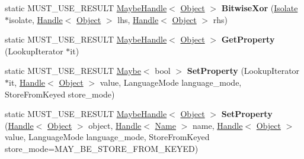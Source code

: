 \begin{DoxyCompactItemize}
\item 
static M\+U\+S\+T\+\_\+\+U\+S\+E\+\_\+\+R\+E\+S\+U\+LT \hyperlink{classv8_1_1internal_1_1_maybe_handle}{Maybe\+Handle}$<$ \hyperlink{classv8_1_1internal_1_1_object}{Object} $>$ {\bfseries Bitwise\+Xor} (\hyperlink{classv8_1_1internal_1_1_isolate}{Isolate} $\ast$isolate, \hyperlink{classv8_1_1internal_1_1_handle}{Handle}$<$ \hyperlink{classv8_1_1internal_1_1_object}{Object} $>$ lhs, \hyperlink{classv8_1_1internal_1_1_handle}{Handle}$<$ \hyperlink{classv8_1_1internal_1_1_object}{Object} $>$ rhs)\hypertarget{classv8_1_1internal_1_1_object_a78654ced315975487c8afea72249be56}{}\label{classv8_1_1internal_1_1_object_a78654ced315975487c8afea72249be56}

\item 
static M\+U\+S\+T\+\_\+\+U\+S\+E\+\_\+\+R\+E\+S\+U\+LT \hyperlink{classv8_1_1internal_1_1_maybe_handle}{Maybe\+Handle}$<$ \hyperlink{classv8_1_1internal_1_1_object}{Object} $>$ {\bfseries Get\+Property} (Lookup\+Iterator $\ast$it)\hypertarget{classv8_1_1internal_1_1_object_a475153ada85d59ad0e0705feb6870345}{}\label{classv8_1_1internal_1_1_object_a475153ada85d59ad0e0705feb6870345}

\item 
static M\+U\+S\+T\+\_\+\+U\+S\+E\+\_\+\+R\+E\+S\+U\+LT \hyperlink{classv8_1_1_maybe}{Maybe}$<$ bool $>$ {\bfseries Set\+Property} (Lookup\+Iterator $\ast$it, \hyperlink{classv8_1_1internal_1_1_handle}{Handle}$<$ \hyperlink{classv8_1_1internal_1_1_object}{Object} $>$ value, Language\+Mode language\+\_\+mode, Store\+From\+Keyed store\+\_\+mode)\hypertarget{classv8_1_1internal_1_1_object_af902e136e8ba0bf005ee1b7560111388}{}\label{classv8_1_1internal_1_1_object_af902e136e8ba0bf005ee1b7560111388}

\item 
static M\+U\+S\+T\+\_\+\+U\+S\+E\+\_\+\+R\+E\+S\+U\+LT \hyperlink{classv8_1_1internal_1_1_maybe_handle}{Maybe\+Handle}$<$ \hyperlink{classv8_1_1internal_1_1_object}{Object} $>$ {\bfseries Set\+Property} (\hyperlink{classv8_1_1internal_1_1_handle}{Handle}$<$ \hyperlink{classv8_1_1internal_1_1_object}{Object} $>$ object, \hyperlink{classv8_1_1internal_1_1_handle}{Handle}$<$ \hyperlink{classv8_1_1internal_1_1_name}{Name} $>$ name, \hyperlink{classv8_1_1internal_1_1_handle}{Handle}$<$ \hyperlink{classv8_1_1internal_1_1_object}{Object} $>$ value, Language\+Mode language\+\_\+mode, Store\+From\+Keyed store\+\_\+mode=M\+A\+Y\+\_\+\+B\+E\+\_\+\+S\+T\+O\+R\+E\+\_\+\+F\+R\+O\+M\+\_\+\+K\+E\+Y\+ED)\hypertarget{classv8_1_1internal_1_1_object_a93d084bf5f42315ff8067f062b963c6c}{}\label{classv8_1_1internal_1_1_object_a93d084bf5f42315ff8067f062b963c6c}


\end{DoxyCompactItemize}
